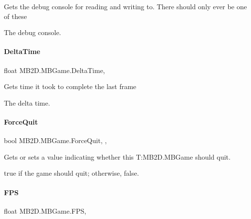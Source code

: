 Gets the debug console for reading and writing to. There should only ever be one of these 

The debug console.\hypertarget{class_m_b2_d_1_1_m_b_game_ad5f17615f6a86c891635491cba99337d}{}\label{class_m_b2_d_1_1_m_b_game_ad5f17615f6a86c891635491cba99337d} 
\paragraph{\texorpdfstring{Delta\+Time}{DeltaTime}}
{\footnotesize\ttfamily float M\+B2\+D.\+M\+B\+Game.\+Delta\+Time\hspace{0.3cm}{\ttfamily [static]}, {\ttfamily [get]}}



Gets time it took to complete the last frame 

The delta time.\hypertarget{class_m_b2_d_1_1_m_b_game_a74cd19bc8809a473a639aed105f0f4e9}{}\label{class_m_b2_d_1_1_m_b_game_a74cd19bc8809a473a639aed105f0f4e9} 
\paragraph{\texorpdfstring{Force\+Quit}{ForceQuit}}
{\footnotesize\ttfamily bool M\+B2\+D.\+M\+B\+Game.\+Force\+Quit\hspace{0.3cm}{\ttfamily [static]}, {\ttfamily [get]}, {\ttfamily [set]}}



Gets or sets a value indicating whether this T\+:\+M\+B2\+D.\+M\+B\+Game should quit. 

{\ttfamily true} if the game should quit; otherwise, {\ttfamily false}.\hypertarget{class_m_b2_d_1_1_m_b_game_acb9e6dfedc44ee2df89aa9714f098faf}{}\label{class_m_b2_d_1_1_m_b_game_acb9e6dfedc44ee2df89aa9714f098faf} 
\paragraph{\texorpdfstring{F\+PS}{FPS}}
{\footnotesize\ttfamily float M\+B2\+D.\+M\+B\+Game.\+F\+PS\hspace{0.3cm}{\ttfamily [static]}, {\ttfamily [get]}}



